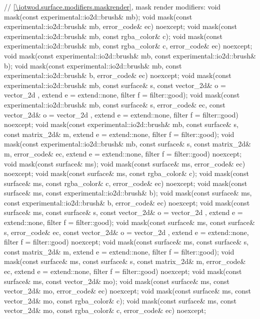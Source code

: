 \begin{codeblock}
{{{{{    // \ref{\iotwod.surface.modifiers.maskrender}, mask render modifiers:
    void mask(const experimental::io2d::brush& mb);
    void mask(const experimental::io2d::brush& mb, error_code& ec)
      noexcept;
    void mask(const experimental::io2d::brush& mb, const rgba_color& c);
    void mask(const experimental::io2d::brush& mb, const rgba_color& c, 
      error_code& ec) noexcept;
    void mask(const experimental::io2d::brush& mb,
      const experimental::io2d::brush& b);
    void mask(const experimental::io2d::brush& mb,
      const experimental::io2d::brush& b, error_code& ec) noexcept;
    void mask(const experimental::io2d::brush& mb, const surface& s,
      const vector_2d& o = vector_2d{ }, extend e = extend::none, 
      filter f = filter::good);
    void mask(const experimental::io2d::brush& mb, const surface& s,
      error_code& ec, const vector_2d& o = vector_2d{ },
      extend e = extend::none, filter f = filter::good) noexcept;
    void mask(const experimental::io2d::brush& mb, const surface& s,
      const matrix_2d& m, extend e = extend::none, filter f = filter::good);
    void mask(const experimental::io2d::brush& mb, const surface& s,
      const matrix_2d& m, error_code& ec, extend e = extend::none,
      filter f = filter::good) noexcept;
    void mask(const surface& ms);
    void mask(const surface& ms, error_code& ec) noexcept;
    void mask(const surface& ms, const rgba_color& c);
    void mask(const surface& ms, const rgba_color& c, error_code& ec) noexcept;
    void mask(const surface& ms, const experimental::io2d::brush& b);
    void mask(const surface& ms, const experimental::io2d::brush& b, 
      error_code& ec) noexcept;
    void mask(const surface& ms, const surface& s,
      const vector_2d& o = vector_2d{ }, extend e = extend::none,
      filter f = filter::good);
    void mask(const surface& ms, const surface& s, error_code& ec,
      const vector_2d& o = vector_2d{ }, extend e = extend::none,
      filter f = filter::good) noexcept;
    void mask(const surface& ms, const surface& s, const matrix_2d& m,
      extend e = extend::none, filter f = filter::good);
    void mask(const surface& ms, const surface& s, const matrix_2d& m,
      error_code& ec, extend e = extend::none, filter f = filter::good)
      noexcept;
    void mask(const surface& ms, const vector_2d& mo);
    void mask(const surface& ms, const vector_2d& mo, error_code& ec) noexcept;
    void mask(const surface& ms, const vector_2d& mo, const rgba_color& c);
    void mask(const surface& ms, const vector_2d& mo, const rgba_color& c,
      error_code& ec) noexcept;
}}}}}
\end{codeblock}
